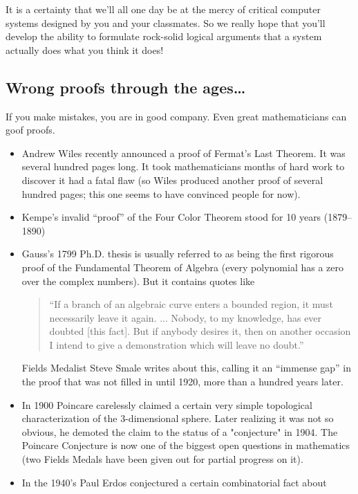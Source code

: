 It is a certainty that we'll all one day be at the mercy of critical
computer systems designed by you and your classmates.  So we really
hope that you'll develop the ability to formulate rock-solid logical
arguments that a system actually does what you think it does!

\begin{editingnotes}
\subsection{Wrong proofs through the ages\dots}

If you make mistakes, you are in good company. 
Even great mathematicians can goof proofs.
\begin{itemize}
\item Andrew Wiles recently announced a proof of Fermat's Last
  Theorem.  It was several hundred pages long.  It took mathematicians
  months of hard work to discover it had a fatal flaw (so Wiles
  produced another proof of several hundred pages; this one seems to
  have convinced people for now).
\item Kempe's invalid ``proof'' of the Four Color Theorem stood for 10
years (1879--1890)
\item Gauss's 1799 Ph.D. thesis is usually referred to as being the
first rigorous proof of the Fundamental Theorem of Algebra (every
polynomial has a zero over the complex numbers).  But it contains
quotes like
\begin{quote}
  ``If a branch of an algebraic curve enters a bounded region, it
   must necessarily leave it again. ... Nobody, to my knowledge,
   has ever doubted [this fact].  But if anybody desires it, then
   on another occasion I intend to give a demonstration which will
   leave no doubt.''
\end{quote}
Fields Medalist Steve Smale writes about this, calling it an ``immense
gap'' in the proof that was not filled in until 1920, more than a hundred
years later.
\item In 1900 Poincare carelessly claimed a certain very simple topological 
characterization of the 3-dimensional sphere.  Later realizing it was 
not so obvious, he demoted the claim to the status of a "conjecture" 
in 1904.  The Poincare Conjecture is now one of the biggest open questions
in mathematics (two Fields Medals have been given out for partial progress
on it).
\item In the 1940's Paul Erdos conjectured a certain combinatorial fact about 

\end{itemize}
\end{editingnotes}
